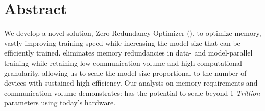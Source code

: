 \section*{Abstract}
We develop a novel solution, Zero Redundancy Optimizer (\name), to optimize memory, vastly improving training speed while increasing the model size that can be efficiently trained.
\name eliminates memory redundancies in data- and model-parallel training while retaining low communication volume and high computational granularity, allowing us to scale the model size proportional to the number of devices with sustained high efficiency. Our analysis on memory requirements and communication volume demonstrates: \name has the potential to scale beyond 1 \emph{Trillion} parameters using today's hardware.
